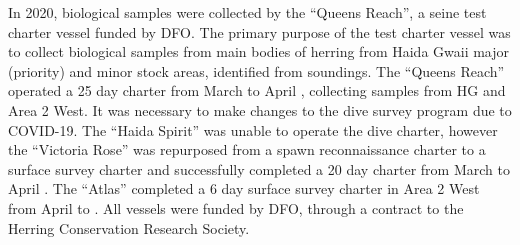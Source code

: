 In 2020, biological samples were collected by the ``Queens Reach'', a seine test charter vessel funded by DFO.
The primary purpose of the test charter vessel was to collect biological samples from main bodies of herring from Haida Gwaii major (priority) and minor stock areas, identified from soundings.
The ``Queens Reach'' operated a 25 day charter from March  to April , collecting samples from HG and Area 2 West.
It was necessary to make changes to the dive survey program due to COVID-19.
The ``Haida Spirit'' was unable to operate the dive charter, however
the ``Victoria Rose'' was repurposed from a spawn reconnaissance charter to a surface survey charter and successfully completed a 20 day charter from March  to April .
The ``Atlas'' completed a 6 day surface survey charter in Area 2 West from April  to .
All vessels were funded by DFO, through a contract to the Herring Conservation Research Society.